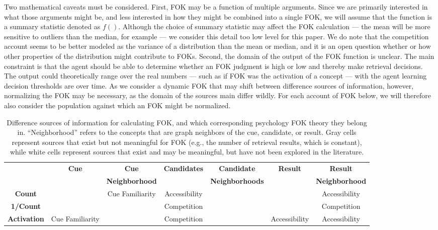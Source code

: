 \documentclass[10pt,letterpaper]{article}
\newcommand{\tableheader}[1]{\multirow{2}{*}{\textbf{#1}}}
\newcommand{\whitecell}[0]{}
\newcommand{\graycell}[0]{\cellcolor{gray!70}}
\begin{document}
Two mathematical caveats must be considered.
First, FOK may be a function of multiple arguments.
Since we are primarily interested in what those arguments might be, and less interested in how they might be combined into a single FOK, we will assume that the function is a summary statistic denoted as $f()$.
Although the choice of summary statistic may affect the FOK calculation --- the mean will be more sensitive to outliers than the median, for example --- we consider this detail too low level for this paper.
We do note that the competition account seems to be better modeled as the variance of a distribution than the mean or median, and it is an open question whether or how other properties of the distribution might contribute to FOKs.
Second, the domain of the output of the FOK function is unclear.
The main constraint is that the agent should be able to determine whether an FOK judgment is high or low and thereby make retrieval decisions.
The output could theoretically range over the real numbers --- such as if FOK was the activation of a concept --- with the agent learning decision thresholds are over time.
As we consider a dynamic FOK that may shift between difference sources of information, however, normalizing the FOK may be necessary, as the domain of the sources main differ wildly.
For each account of FOK below, we will therefore also consider the population against which an FOK might be normalized.

\begin{table*}[ht]
\centering
\begin{tabular}{c|cccccc}
\whitecell           &  \tableheader{Cue}  &  \textbf{Cue}           &  \tableheader{Candidates}  &  \textbf{Candidate}      &  \tableheader{Result}  &  \textbf{Result}        \\
\whitecell           &  \whitecell         &  \textbf{Neighborhood}  &  \whitecell                &  \textbf{Neighborhoods}  &  \whitecell            &  \textbf{Neighborhood}  \\
\hline
\textbf{Count}       &  \graycell          &  Cue Familiarity        &  Accessibility             &  \whitecell              &  \graycell             &  Accessibility          \\
\textbf{1/Count}     &  \graycell          &  \whitecell             &  Competition               &  \whitecell              &  \graycell             &  Competition            \\
\textbf{Activation}  &  Cue Familiarity    &  \whitecell             &  Competition               &  \whitecell              &  Accessibility         &  Accessibility          \\
\end{tabular}

\caption{
    Difference sources of information for calculating FOK, and which corresponding psychology FOK theory they belong in.
    ``Neighborhood'' refers to the concepts that are graph neighbors of the cue, candidate, or result.
    Gray cells represent sources that exist but not meaningful for FOK (e.g., the number of retrieval results, which is constant), while white cells represent sources that exist and may be meaningful, but have not been explored in the literature.
}
\label{sources}
\end{table*}
\end{document}
